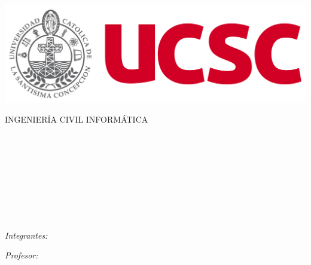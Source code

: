 \begin{center}                                                    
    \begin{minipage}{0.48\textwidth} 
        \centering
        \includegraphics[scale=0.19]{img/escudoof.png}
    \end{minipage}

    \textsc{\huge INGENIERÍA CIVIL INFORMÁTICA}\\[2.5 cm] 

    \begin{minipage}{0.9\textwidth} 
        \begin{center}                  
            \textsc{\LARGE \RAMO{}}\\[0.5cm]  
            \textsc{\LARGE \CODRAMO{}}\\[1.5cm] 
        \end{center}
    \end{minipage}\\[0.5cm]
          
    \vspace*{1cm}        
                                 
    \HRule \\[0.4cm]                 
    {\huge \bfseries \TITULO{}}\\[0.4cm]                          
    \HRule \\[2.0cm]

                                 
    \begin{minipage}{0.42\textwidth} 
        \begin{flushleft} \large         
        \emph{Integrantes:}\\   
        \INTEGRANTES{}
        \end{flushleft}                  
    \end{minipage}      

    \begin{minipage}{0.52\textwidth}        
        \vspace{-0.6cm}
        \begin{flushright} \large        
            \emph{Profesor:} \\              
            \PROFESORES
        \end{flushright}                 
    \end{minipage}  
    

\end{center}
